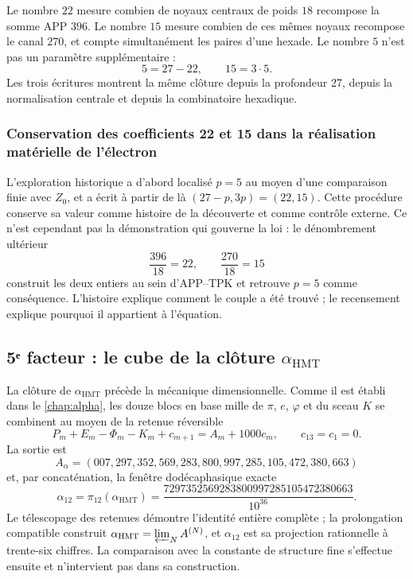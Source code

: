 Le nombre \(22\) mesure combien de noyaux centraux de poids \(18\) recompose la
somme APP \(396\). Le nombre \(15\) mesure combien de ces mêmes noyaux
recompose le canal \(270\), et compte simultanément les paires d'une
hexade. Le nombre \(5\) n'est pas un paramètre supplémentaire :
\[
 5=27-22,\qquad 15=3\cdot5.
\]
Les trois écritures montrent la même clôture depuis la profondeur 27,
depuis la normalisation centrale et depuis la combinatoire hexadique.

\subsubsection{Conservation des coefficients 22 et 15 dans la réalisation matérielle de l'électron}

L'exploration historique a d'abord localisé \(p=5\) au moyen d'une comparaison
finie avec \(Z_0\), et a écrit à partir de là
\((27-p,3p)=(22,15)\). Cette procédure conserve sa valeur comme histoire de la
découverte et comme contrôle externe. Ce n'est cependant pas la démonstration
qui gouverne la loi : le dénombrement ultérieur
\[
 \frac{396}{18}=22,
 \qquad
 \frac{270}{18}=15
\]
construit les deux entiers au sein d'APP--TPK et retrouve \(p=5\) comme
conséquence. L'histoire explique comment le couple a été trouvé ; le recensement
explique pourquoi il appartient à l'équation.

\subsection{5ᵉ facteur : le cube de la clôture \(\alpha_{\mathrm{HMT}}\)}

La clôture de \(\alpha_{\mathrm{HMT}}\) précède la mécanique dimensionnelle.
Comme il est établi dans le \cref{chap:alpha}, les douze blocs en base mille
de \(\pi\), \(e\), \(\varphi\) et du sceau \(K\) se combinent au moyen de la
retenue réversible
\[
 P_m+E_m-\Phi_m-K_m+c_{m+1}
 =A_m+1000c_m,
 \qquad c_{13}=c_1=0.
\]
La sortie est
\[
 A_\alpha=
 (007,297,352,569,283,800,997,285,105,472,380,663)
\]
et, par concaténation, la fenêtre dodécaphasique exacte
\[
 \alpha_{12}=\pi_{12}(\alpha_{\mathrm{HMT}})
 =
 \frac{
 7297352569283800997285105472380663
 }{10^{36}}.
\]
Le télescopage des retenues démontre l'identité entière complète ; la
prolongation compatible construit
\(\alpha_{\mathrm{HMT}}=\varprojlim_N A^{(N)}\), et \(\alpha_{12}\) est sa
projection rationnelle à trente-six chiffres. La
comparaison avec la constante de structure fine s'effectue ensuite et
n'intervient pas dans sa construction.

